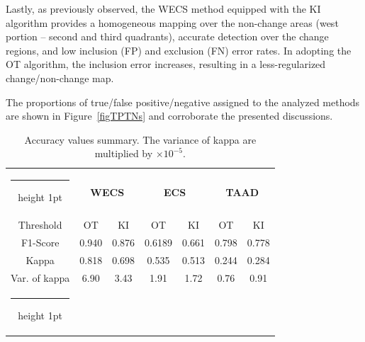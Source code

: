 \documentclass[journal]{IEEEtran}
\makeatletter
\newcommand{\thickhline}{\noalign {\ifnum 0=`}\fi \hrule height 1pt \futurelet \reserved@a \@xhline}
\makeatother
\begin{document}
Lastly, as previously observed, the WECS method equipped with the KI algorithm provides a homogeneous mapping over the non-change areas (west portion -- second and third quadrants), accurate detection over the change regions, and low inclusion (FP) and exclusion (FN) error rates. In adopting the OT algorithm, the inclusion error increases, resulting in a less-regularized change/non-change map.

The proportions of true/false positive/negative assigned to the analyzed methods are shown in Figure~\ref{figTPTNs} and corroborate the presented discussions.





\begin{table}[H]
\caption{Accuracy values summary. The variance of kappa are multiplied by $\times 10^{-5}$.}\label{tabAccExpSentinel}
\centering
\begin{tabular}{ccccccc}
\thickhline
 & \multicolumn{2}{c}{\textbf{WECS}} & \multicolumn{2}{c}{\textbf{ECS}} & \multicolumn{2}{c}{\textbf{TAAD}}\tabularnewline
Threshold & OT & KI & OT & KI & OT & KI\tabularnewline
\hline 
F1-Score & 0.940 & 0.876 & 0.6189 & 0.661 & 0.798 & 0.778\tabularnewline
Kappa & 0.818 & 0.698 & 0.535 & 0.513 & 0.244 & 0.284\tabularnewline
Var. of kappa & 6.90 & 3.43 & 1.91 & 1.72 & 0.76 & 0.91 \tabularnewline
\thickhline
\end{tabular}
\end{table}
\end{document}
